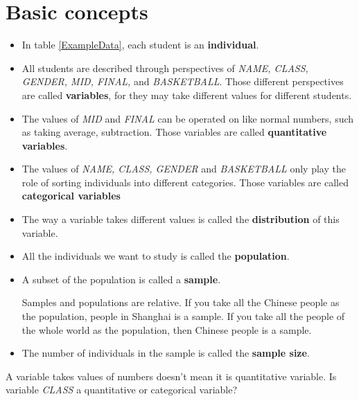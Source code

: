 \documentclass[a4paper, 12pt,twoside]{book}
\begin{document}
\section{Basic concepts}
\begin{itemize}
\item In  table \ref{ExampleData}, each student is an \textbf{individual}.
\item All students are described through perspectives of \textit{NAME, CLASS, GENDER, MID, FINAL,} and \textit{BASKETBALL}. Those different perspectives are called \textbf{variables}, for they may take different values for different students.
\item The values of \textit{MID} and \textit{FINAL} can be operated on like normal numbers, such as taking average, subtraction. Those variables are called 
\textbf{quantitative variables}.
\item The values of \textit{NAME, CLASS, GENDER} and \textit{BASKETBALL} only play the role of sorting individuals into different categories. Those variables are called \textbf{categorical variables}
\item The way a variable takes different values is called the \textbf{distribution} of this variable.
\item All the individuals we want to study is called the \textbf{population}.
\item A subset of the population is called a \textbf{sample}.

\colorbox{babypink}{Samples and populations are relative.} If you take all the Chinese people as the population, people in Shanghai is a sample. If you take all the people of the whole world as the population, then Chinese people is a sample.
\item The number of individuals in the sample is called the \textbf{sample size}.

\end{itemize}



\colorbox{babypink}{\parbox{15.2cm}{A variable takes values of numbers doesn't mean it is quantitative variable. Is variable \textit{CLASS} a quantitative or categorical variable?}}
\end{document}
